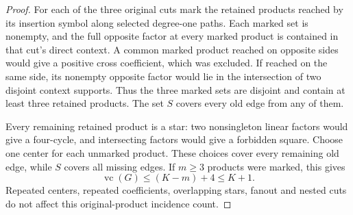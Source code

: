 \documentclass[11pt]{article}
\newcommand{\vc}{\operatorname{vc}}
\theoremstyle{definition}
\theoremstyle{remark}
\begin{document}
\begin{proof}
For each of the three original cuts mark the retained products reached by its insertion symbol along selected degree-one paths. Each marked set is nonempty, and the full opposite factor at every marked product is contained in that cut's direct context. A common marked product reached on opposite sides would give a positive cross coefficient, which was excluded. If reached on the same side, its nonempty opposite factor would lie in the intersection of two disjoint context supports. Thus the three marked sets are disjoint and contain at least three retained products. The set $S$ covers every old edge from any of them.

Every remaining retained product is a star: two nonsingleton linear factors would give a four-cycle, and intersecting factors would give a forbidden square. Choose one center for each unmarked product. These choices cover every remaining old edge, while $S$ covers all missing edges. If $m\ge3$ products were marked, this gives
\[
 \vc(G)\le (K-m)+4\le K+1.
\]
Repeated centers, repeated coefficients, overlapping stars, fanout and nested cuts do not affect this original-product incidence count.
\end{proof}
\end{document}
